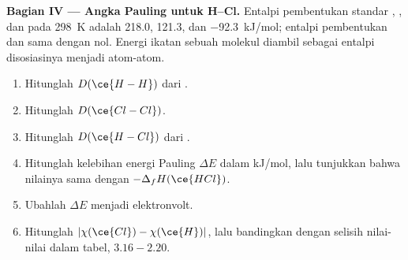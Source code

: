 \begin{problem}
\medskip
\noindent\textbf{Bagian IV --- Angka Pauling untuk H--Cl.}
Entalpi pembentukan standar , , dan  pada
\qty{298}{K} adalah 218.0, 121.3, dan \qty{-92.3}{kJ/mol}; entalpi
pembentukan  dan  sama dengan nol. Energi ikatan
sebuah molekul diambil sebagai entalpi disosiasinya menjadi atom-atom.
\begin{enumerate}[resume]
  \item Hitunglah $D(\ce{H-H})$ dari .
  \item Hitunglah $D(\ce{Cl-Cl})$.
  \item Hitunglah $D(\ce{H-Cl})$ dari .
  \item Hitunglah kelebihan energi Pauling $\Delta E$ dalam kJ/mol, lalu
        tunjukkan bahwa nilainya sama dengan $-\Delta_f H(\ce{HCl})$.
  \item Ubahlah $\Delta E$ menjadi elektronvolt.
  \item Hitunglah $|\chi(\ce{Cl}) - \chi(\ce{H})|$, lalu bandingkan
        dengan selisih nilai-nilai dalam tabel, $3.16 - 2.20$.
\end{enumerate}
\end{problem}

